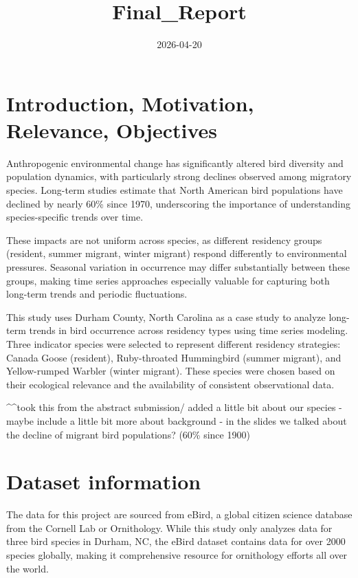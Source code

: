 \documentclass[
]{article}
\title{Final\_Report}
\author{}
\date{\vspace{-2.5em}2026-04-20}
\begin{document}
\maketitle

\section{Introduction, Motivation, Relevance,
Objectives}\label{introduction-motivation-relevance-objectives}

Anthropogenic environmental change has significantly altered bird
diversity and population dynamics, with particularly strong declines
observed among migratory species. Long-term studies estimate that North
American bird populations have declined by nearly 60\% since 1970,
underscoring the importance of understanding species-specific trends
over time.

These impacts are not uniform across species, as different residency
groups (resident, summer migrant, winter migrant) respond differently to
environmental pressures. Seasonal variation in occurrence may differ
substantially between these groups, making time series approaches
especially valuable for capturing both long-term trends and periodic
fluctuations.

This study uses Durham County, North Carolina as a case study to analyze
long-term trends in bird occurrence across residency types using time
series modeling. Three indicator species were selected to represent
different residency strategies: Canada Goose (resident), Ruby-throated
Hummingbird (summer migrant), and Yellow-rumped Warbler (winter
migrant). These species were chosen based on their ecological relevance
and the availability of consistent observational data.

\^{}\^{}took this from the abstract submission/ added a little bit about
our species - maybe include a little bit more about background - in the
slides we talked about the decline of migrant bird populations? (60\%
since 1900)

\section{Dataset information}\label{dataset-information}

The data for this project are sourced from eBird, a global citizen
science database from the Cornell Lab or Ornithology. While this study
only analyzes data for three bird species in Durham, NC, the eBird
dataset contains data for over 2000 species globally, making it
comprehensive resource for ornithology efforts all over the world.
\end{document}
